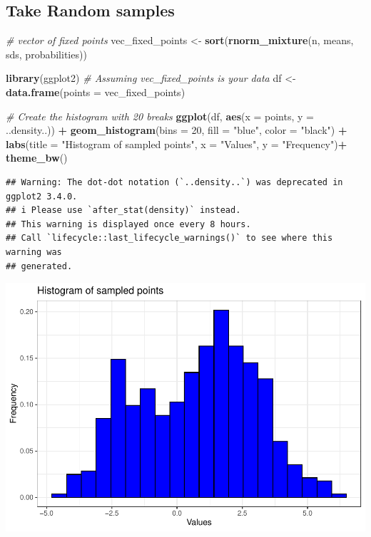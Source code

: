 \documentclass[
]{article}
\newenvironment{Shaded}{\begin{snugshade}}{\end{snugshade}}
\newcommand{\AttributeTok}[1]{\textcolor[rgb]{0.13,0.29,0.53}{#1}}
\newcommand{\CommentTok}[1]{\textcolor[rgb]{0.56,0.35,0.01}{\textit{#1}}}
\newcommand{\DecValTok}[1]{\textcolor[rgb]{0.00,0.00,0.81}{#1}}
\newcommand{\FunctionTok}[1]{\textcolor[rgb]{0.13,0.29,0.53}{\textbf{#1}}}
\newcommand{\NormalTok}[1]{#1}
\newcommand{\OtherTok}[1]{\textcolor[rgb]{0.56,0.35,0.01}{#1}}
\newcommand{\SpecialCharTok}[1]{\textcolor[rgb]{0.81,0.36,0.00}{\textbf{#1}}}
\newcommand{\StringTok}[1]{\textcolor[rgb]{0.31,0.60,0.02}{#1}}
\begin{document}
\subsection{Take Random samples}\label{take-random-samples}

\begin{Shaded}
\begin{Highlighting}[]
\CommentTok{\# vector of fixed points}
\NormalTok{vec\_fixed\_points }\OtherTok{\textless{}{-}} \FunctionTok{sort}\NormalTok{(}\FunctionTok{rnorm\_mixture}\NormalTok{(n, means, sds, probabilities))}

\FunctionTok{library}\NormalTok{(ggplot2)}
\CommentTok{\# Assuming vec\_fixed\_points is your data}
\NormalTok{df }\OtherTok{\textless{}{-}} \FunctionTok{data.frame}\NormalTok{(}\AttributeTok{points =}\NormalTok{ vec\_fixed\_points)}

\CommentTok{\# Create the histogram with 20 breaks}
\FunctionTok{ggplot}\NormalTok{(df, }\FunctionTok{aes}\NormalTok{(}\AttributeTok{x =}\NormalTok{ points, }\AttributeTok{y =}\NormalTok{ ..density..)) }\SpecialCharTok{+}
  \FunctionTok{geom\_histogram}\NormalTok{(}\AttributeTok{bins =} \DecValTok{20}\NormalTok{, }\AttributeTok{fill =} \StringTok{"blue"}\NormalTok{, }\AttributeTok{color =} \StringTok{"black"}\NormalTok{) }\SpecialCharTok{+}
  \FunctionTok{labs}\NormalTok{(}\AttributeTok{title =} \StringTok{"Histogram of sampled points"}\NormalTok{, }\AttributeTok{x =} \StringTok{"Values"}\NormalTok{, }\AttributeTok{y =} \StringTok{"Frequency"}\NormalTok{)}\SpecialCharTok{+}
  \FunctionTok{theme\_bw}\NormalTok{()}
\end{Highlighting}
\end{Shaded}

\begin{verbatim}
## Warning: The dot-dot notation (`..density..`) was deprecated in ggplot2 3.4.0.
## i Please use `after_stat(density)` instead.
## This warning is displayed once every 8 hours.
## Call `lifecycle::last_lifecycle_warnings()` to see where this warning was
## generated.
\end{verbatim}

\includegraphics{direct_approach_kef_Brownian_kernel_files/figure-latex/unnamed-chunk-4-1.pdf}
\end{document}
